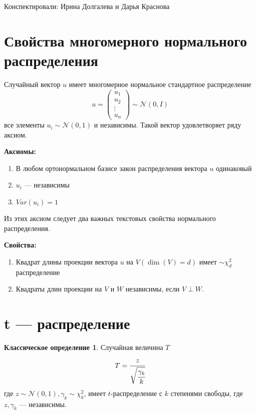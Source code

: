 \documentclass[12pt]{article} %
\theoremstyle{definition} %
\def \cN{\mathcal{N}}
\def \cChi{\mathcal{\chi}}
\begin{document}
Конспектировали: Ирина Долгалева и Дарья Краснова

\section{Свойства многомерного нормального распределения}
    Случайный вектор $u$ имеет многомерное нормальное стандартное распределение 
    \[
        u = \begin{pmatrix} u_1 \\ u_2 \\ \vdots \\ u_n \end{pmatrix} \sim \cN(0, I)
    \]
    все элементы $u_i \sim\cN(0, 1)$ и независимы.
Такой вектор удовлетворяет ряду аксиом.

\textbf{Аксиомы:}
\begin{enumerate}
    \item В любом ортонормальном базисе закон распределения вектора $u$ одинаковый
    \item $u_i$ — независимы
    \item $Var(u_i) = 1$
\end{enumerate} 
    
\par

Из этих аксиом следует два важных текстовых свойства нормального распределения.    

\textbf{Свойства:}
\begin{enumerate}    
    \item Квадрат длины проекции вектора $u$ на $V (\dim(V) = d)$ имеет $\sim\cChi_{d}^2$ распределение
    \item Квадраты длин проекции на $V$ и $W$ независимы, если  $V \perp W$.
\end{enumerate}

 


\section{t — распределение}
\newtheorem*{classic_def}{Классическое определение}
\begin{classic_def}\hspace{2cm} \par
\smallskip
    Случайная величина $T$
    \[
        T = \cfrac{z}{\sqrt{\cfrac{\gamma_k}{k}}}
    \]
    где $z \sim \cN(0,1), \gamma_k \sim \cChi_k^2$,
    имеет $t$-распределение с $k$ степенями свободы, где $z, \gamma_k$  — независимы.
\end{classic_def}
\end{document}
